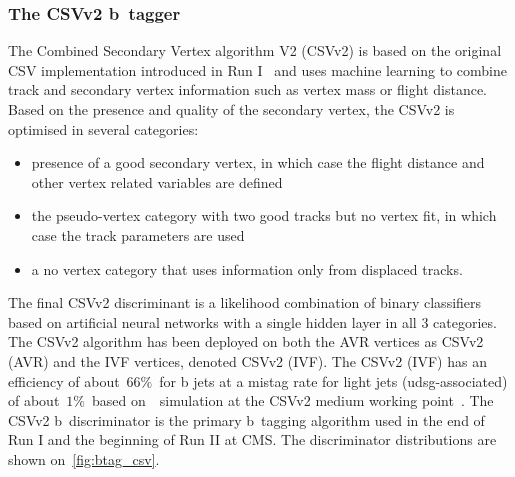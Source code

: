 \subsubsection{The CSVv2 b~tagger}
The Combined Secondary Vertex algorithm V2 (CSVv2) is based on the original CSV implementation introduced in Run I~\cite{Chatrchyan:2012jua} and uses machine learning to combine track and secondary vertex information such as vertex mass or flight distance. Based on the presence and quality of the secondary vertex, the CSVv2 is optimised in several categories:
\begin{itemize}
\item presence of a good secondary vertex, in which case the flight distance and other vertex related variables are defined
\item the pseudo-vertex category with two good tracks but no vertex fit, in which case the track parameters are used
\item a no vertex category that uses information only from displaced tracks.
\end{itemize}
The final CSVv2 discriminant is a likelihood combination of binary classifiers based on artificial neural networks with a single hidden layer in all 3 categories. The CSVv2 algorithm has been deployed on both the AVR vertices as CSVv2 (AVR) and the IVF vertices, denoted CSVv2 (IVF). The CSVv2 (IVF) has an efficiency of about~$66\%$~for b jets at a mistag rate for light jets (udsg-associated) of about~$1\%$~based on~\ttbar~simulation at the CSVv2 medium working point~\cite{CMS-PAS-BTV-15-001}. The CSVv2 b~discriminator is the primary b~tagging algorithm used in the end of Run I and the beginning of Run II at CMS. The discriminator distributions are shown on~\cref{fig:btag_csv}.

